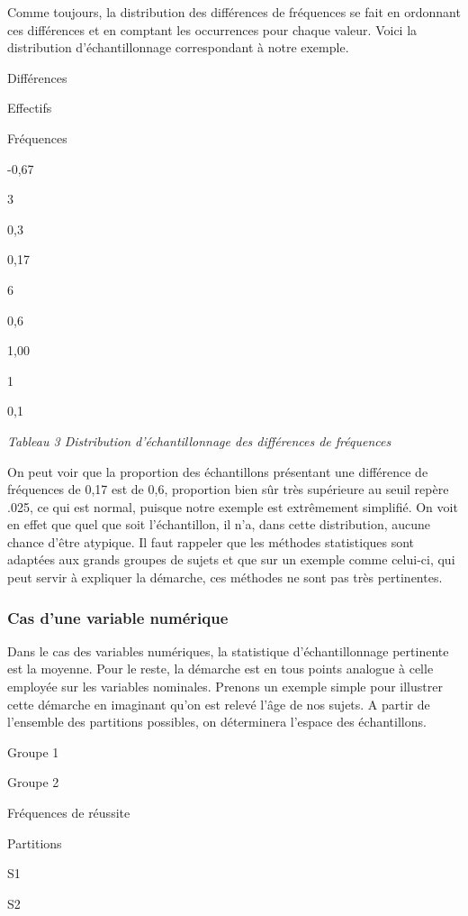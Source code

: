 \documentclass[]{book}
\theoremstyle{definition}
\theoremstyle{definition}
\theoremstyle{definition}
\theoremstyle{remark}
\begin{document}
Comme toujours, la distribution des différences de fréquences se fait en
ordonnant ces différences et en comptant les occurrences pour chaque
valeur. Voici la distribution d'échantillonnage correspondant à notre
exemple.

Différences

Effectifs

Fréquences

-0,67

3

0,3

0,17

6

0,6

1,00

1

0,1

\emph{Tableau 3 Distribution d'échantillonnage des différences de
fréquences}

On peut voir que la proportion des échantillons présentant une
différence de fréquences de 0,17 est de 0,6, proportion bien sûr très
supérieure au seuil repère .025, ce qui est normal, puisque notre
exemple est extrêmement simplifié. On voit en effet que quel que soit
l'échantillon, il n'a, dans cette distribution, aucune chance d'être
atypique. Il faut rappeler que les méthodes statistiques sont adaptées
aux grands groupes de sujets et que sur un exemple comme celui-ci, qui
peut servir à expliquer la démarche, ces méthodes ne sont pas très
pertinentes.

\hypertarget{cas-dune-variable-numerique-1}{%
\subsubsection{Cas d'une variable
numérique}\label{cas-dune-variable-numerique-1}}

Dans le cas des variables numériques, la statistique d'échantillonnage
pertinente est la moyenne. Pour le reste, la démarche est en tous points
analogue à celle employée sur les variables nominales. Prenons un
exemple simple pour illustrer cette démarche en imaginant qu'on est
relevé l'âge de nos sujets. A partir de l'ensemble des partitions
possibles, on déterminera l'espace des échantillons.

Groupe 1

Groupe 2

Fréquences de réussite

Partitions

S1

S2
\end{document}
